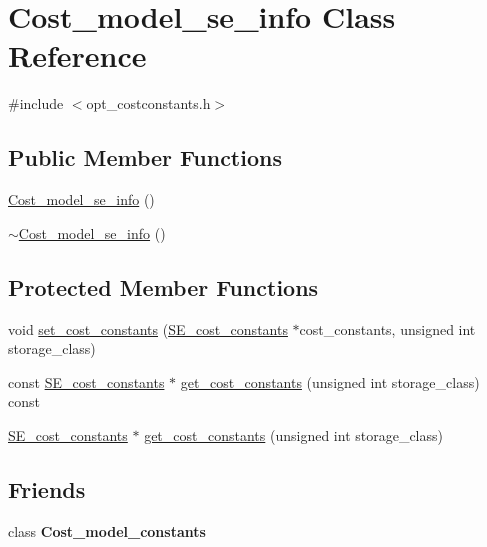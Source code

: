 \hypertarget{classCost__model__se__info}{}\section{Cost\+\_\+model\+\_\+se\+\_\+info Class Reference}
\label{classCost__model__se__info}


{\ttfamily \#include $<$opt\+\_\+costconstants.\+h$>$}

\subsection*{Public Member Functions}
\begin{DoxyCompactItemize}
\item 
\mbox{\hyperlink{classCost__model__se__info_ab23a70b0b93eb24f1611be752b0508fa}{Cost\+\_\+model\+\_\+se\+\_\+info}} ()
\item 
\mbox{\hyperlink{classCost__model__se__info_af6efaed0d3ca48042e7001f74b9126a7}{$\sim$\+Cost\+\_\+model\+\_\+se\+\_\+info}} ()
\end{DoxyCompactItemize}
\subsection*{Protected Member Functions}
\begin{DoxyCompactItemize}
\item 
void \mbox{\hyperlink{classCost__model__se__info_a9fe09e562399a9f942de3dfdbc46eb25}{set\+\_\+cost\+\_\+constants}} (\mbox{\hyperlink{classSE__cost__constants}{S\+E\+\_\+cost\+\_\+constants}} $\ast$cost\+\_\+constants, unsigned int storage\+\_\+class)
\item 
const \mbox{\hyperlink{classSE__cost__constants}{S\+E\+\_\+cost\+\_\+constants}} $\ast$ \mbox{\hyperlink{classCost__model__se__info_ae9c47067de0d97223937e46188312f0d}{get\+\_\+cost\+\_\+constants}} (unsigned int storage\+\_\+class) const
\item 
\mbox{\hyperlink{classSE__cost__constants}{S\+E\+\_\+cost\+\_\+constants}} $\ast$ \mbox{\hyperlink{classCost__model__se__info_a750bea533208ff61e58bd9982b91ae4b}{get\+\_\+cost\+\_\+constants}} (unsigned int storage\+\_\+class)
\end{DoxyCompactItemize}
\subsection*{Friends}
\begin{DoxyCompactItemize}
\item 
\mbox{\label{classCost__model__se__info_a89234022b3383f6f23831568979c4ab3}} 
class {\bfseries Cost\+\_\+model\+\_\+constants}
\end{DoxyCompactItemize}


